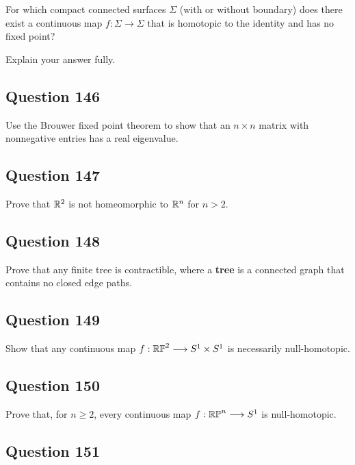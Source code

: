 \documentclass[12pt]{article}
\begin{document}
For which compact connected surfaces \(\Sigma\) (with or without
boundary) does there exist a continuous map \(f : \Sigma \to \Sigma\)
that is homotopic to the identity and has no fixed point?

Explain your answer fully.

\hypertarget{question-146}{%
\subsection{Question 146}\label{question-146}}

Use the Brouwer fixed point theorem to show that an \(n \times n\)
matrix with nonnegative entries has a real eigenvalue.

\hypertarget{question-147}{%
\subsection{Question 147}\label{question-147}}

Prove that \({\mathbb{R}}^2\) is not homeomorphic to \({\mathbb{R}}^n\) for \(n > 2\).

\hypertarget{question-148}{%
\subsection{Question 148}\label{question-148}}

Prove that any finite tree is contractible, where a \textbf{tree} is a
connected graph that contains no closed edge paths.

\hypertarget{question-149}{%
\subsection{Question 149}\label{question-149}}

Show that any continuous map \(f : {\mathbb{RP}}^2 \longrightarrow S^1 \times S^1\) is
necessarily null-homotopic.

\hypertarget{question-150}{%
\subsection{Question 150}\label{question-150}}

Prove that, for \(n \geq 2\), every continuous map \(f: {\mathbb{RP}}^n \longrightarrow S^1\)
is null-homotopic.

\hypertarget{question-151}{%
\subsection{Question 151}\label{question-151}}
\end{document}
